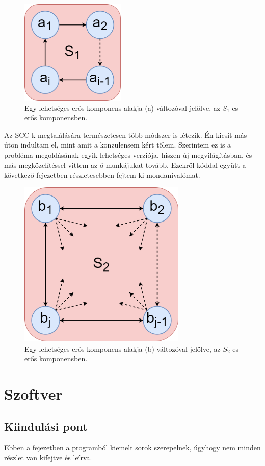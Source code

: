 \documentclass[
]{thesis-ekf}
\theoremstyle{definition}
\theoremstyle{remark}
\begin{document}
	\begin{figure}[!ht]
		\centering
		\includegraphics[width=5cm]{images/sajat_pelda-altalanos_scck_a}
		\caption{Egy lehetséges erős komponens alakja (a) változóval jelölve, az $ S_1 $-es erős komponensben.}
		\label{abra-sajatpelda-altalanos_scck_a-verzio}
	\end{figure}
	\newpage	
	Az \textsc{SCC}-k megtalálására természetesen több módszer is létezik. Én kicsit más úton indultam el, mint amit a konzulensem kért tőlem. Szerintem ez is a probléma megoldásának egyik lehetséges verziója, hiszen új megvilágításban, és más megközelítéssel vittem az ő munkájukat tovább. Ezekről kóddal együtt a következő fejezetben részletesebben fejtem ki mondanivalómat.
	\begin{figure}[!ht]
		\centering
		\includegraphics[width=8cm]{images/sajat_pelda-altalanos_scck_b2}
		\caption{Egy lehetséges erős komponens alakja (b) változóval jelölve, az $ S_2 $-es erős komponensben.}
		\label{abra-sajatpelda-altalanos_scck_b-verzio}
	\end{figure}
	
\chapter{Szoftver}
	\section{Kiindulási pont}
	Ebben a fejezetben a programból kiemelt sorok szerepelnek, úgyhogy nem minden részlet van kifejtve és leírva.
	
\end{document}
